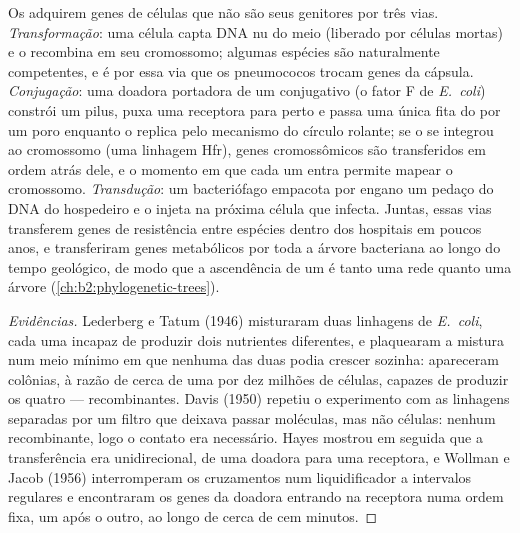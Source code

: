 \begin{definition}\label{def:b2:genome-diversification:hgt}
Os  adquirem genes de células que não são seus genitores
por três vias. \emph{Transformação}: uma célula capta DNA nu do meio
(liberado por células mortas) e o recombina em seu cromossomo; algumas
espécies são naturalmente competentes, e é por essa via que os
pneumococos trocam genes da cápsula. \emph{Conjugação}:
uma doadora portadora de um  conjugativo (o fator F de
\emph{E.~coli}) constrói um pilus, puxa uma receptora para perto e
passa uma única fita do  por um poro enquanto o replica pelo
mecanismo do círculo rolante; se o  se integrou ao cromossomo
(uma linhagem Hfr), genes cromossômicos são transferidos em ordem
atrás dele, e o momento em que cada um entra permite mapear o
cromossomo. \emph{Transdução}: um bacteriófago empacota por engano um
pedaço do DNA do hospedeiro e o injeta na próxima célula que infecta.
Juntas, essas vias transferem genes de resistência entre espécies
dentro dos hospitais em poucos anos, e transferiram genes metabólicos
por toda a árvore bacteriana ao longo do tempo geológico, de modo que
a ascendência de um  é tanto uma rede quanto uma árvore
(\cref{ch:b2:phylogenetic-trees}).
\end{definition}
\begin{proof}[Evidências]
Lederberg e Tatum (1946) misturaram duas linhagens de \emph{E.~coli},
cada uma incapaz de produzir dois nutrientes diferentes, e plaquearam
a mistura num meio mínimo em que nenhuma das duas podia crescer
sozinha: apareceram colônias, à razão de cerca de uma por dez milhões
de células, capazes de produzir os quatro --- recombinantes. Davis
(1950) repetiu o experimento com as linhagens separadas por um filtro
que deixava passar moléculas, mas não células: nenhum recombinante,
logo o contato era necessário. Hayes mostrou em seguida que a
transferência era unidirecional, de uma doadora para uma receptora, e
Wollman e Jacob (1956) interromperam os cruzamentos num liquidificador
a intervalos regulares e encontraram os genes da doadora entrando na
receptora numa ordem fixa, um após o outro, ao longo de cerca de cem
minutos.
\end{proof}


